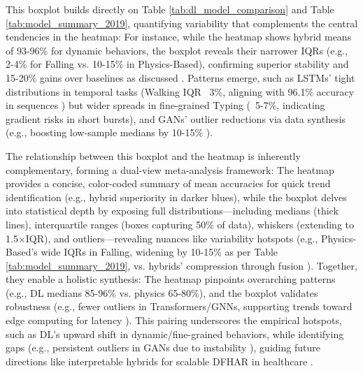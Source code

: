 \documentclass[Afour,sageh,times]{sagej}
\begin{document}
This boxplot builds directly on Table \ref{tab:dl_model_comparison} and Table \ref{tab:model_summary_2019}, quantifying variability that complements the central tendencies in the heatmap: For instance, while the heatmap shows hybrid means of 93-96\% for dynamic behaviors, the boxplot reveals their narrower IQRs (e.g., 2-4\% for Falling vs. 10-15\% in Physics-Based), confirming superior stability and 15-20\% gains over baselines as discussed \citep{zhou2022target}. Patterns emerge, such as LSTMs' tight distributions in temporal tasks (Walking IQR ~3\%, aligning with 96.1\% accuracy in sequences \citep{chen2018wifi}) but wider spreads in fine-grained Typing (~5-7\%, indicating gradient risks in short bursts), and GANs' outlier reductions via data synthesis (e.g., boosting low-sample medians by 10-15\% \citep{wang2021multimodal}).

The relationship between this boxplot and the heatmap is inherently complementary, forming a dual-view meta-analysis framework: The heatmap provides a concise, color-coded summary of mean accuracies for quick trend identification (e.g., hybrid superiority in darker blues), while the boxplot delves into statistical depth by exposing full distributions—including medians (thick lines), interquartile ranges (boxes capturing 50\% of data), whiskers (extending to 1.5×IQR), and outliers—revealing nuances like variability hotspots (e.g., Physics-Based's wide IQRs in Falling, widening by 10-15\% as per Table \ref{tab:model_summary_2019}, vs. hybrids' compression through fusion \citep{yang2022deep}). Together, they enable a holistic synthesis: The heatmap pinpoints overarching patterns (e.g., DL medians 85-96\% vs. physics 65-80\%), and the boxplot validates robustness (e.g., fewer outliers in Transformers/GNNs, supporting trends toward edge computing for latency \citep{shen2022graph}). This pairing underscores the empirical hotspots, such as DL's upward shift in dynamic/fine-grained behaviors, while identifying gaps (e.g., persistent outliers in GANs due to instability \citep{chen2019dynamic}), guiding future directions like interpretable hybrids for scalable DFHAR in healthcare \citep{islam2020wi}. 
\end{document}
